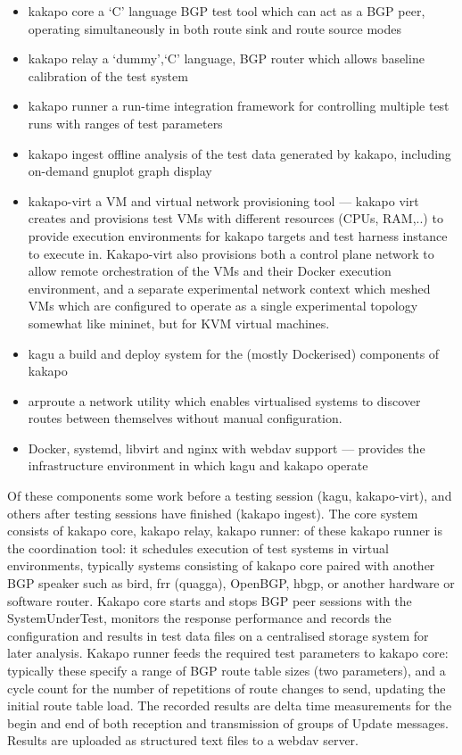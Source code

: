 \begin{itemize}
	\item kakapo core  a ‘C’ language BGP test tool which can act
	      as a BGP peer, operating simultaneously in both route sink and route source
	      modes
	\item kakapo relay  a ‘dummy’,‘C’ language, BGP router which allows
	      baseline calibration of the test system
	\item kakapo runner  a run-time
	      integration framework for controlling multiple test runs with ranges of
	      test parameters
	\item kakapo ingest  offline analysis of the test data
	      generated by kakapo, including on-demand gnuplot graph display
	\item
	      kakapo-virt  a VM and virtual network provisioning tool --- kakapo virt
	      creates and provisions test VMs with different resources (CPUs, RAM,..) to
	      provide execution environments for kakapo targets and test harness instance
	      to execute in.  Kakapo-virt also provisions both a control plane network to
	      allow remote orchestration of the VMs and their Docker execution
	      environment, and a separate experimental network context which meshed VMs
	      which are configured to operate as a single experimental topology
	      somewhat like mininet, but for KVM virtual machines.

	\item kagu a build and deploy system for the (mostly Dockerised) components of kakapo
	\item arproute a network utility which enables virtualised systems to discover routes between themselves without manual configuration.
	\item Docker, systemd, libvirt and nginx with webdav support --- provides the infrastructure environment in which kagu and kakapo operate
\end{itemize}

Of these components some work before a testing session (kagu, kakapo-virt), and
others after testing sessions have finished (kakapo ingest).  The core system
consists of kakapo core, kakapo relay, kakapo runner: of these kakapo runner
is the coordination tool: it schedules execution of test systems in virtual
environments, typically systems consisting of kakapo core paired with another
BGP speaker such as bird, frr (quagga), OpenBGP, hbgp, or another hardware or
software router.  Kakapo core starts and stops BGP peer sessions with the
SystemUnderTest, monitors the response performance and records the
configuration and results in test data files on a centralised storage system
for later analysis.  Kakapo runner feeds the required test parameters to kakapo
core: typically these specify a range of BGP route table sizes (two
parameters), and a cycle count for the number of repetitions of route changes
to send, updating the initial route table load.  The recorded results are delta
time measurements for the begin and end of both reception and transmission of
groups of Update messages.  Results are uploaded as structured text files to
a webdav server.

